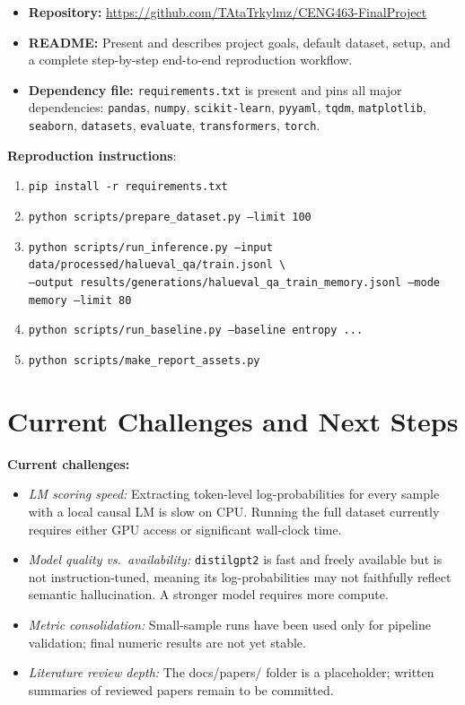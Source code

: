 \documentclass[12pt,a4paper]{article}
\begin{document}
\begin{itemize}
  \item \textbf{Repository:} \url{https://github.com/TAtaTrkylmz/CENG463-FinalProject}
  \item \textbf{README:} Present and describes project goals, default dataset, setup, and a complete step-by-step end-to-end reproduction workflow.
  \item \textbf{Dependency file:} \texttt{requirements.txt} is present and pins all major dependencies:
    \texttt{pandas}, \texttt{numpy}, \texttt{scikit-learn}, \texttt{pyyaml}, \texttt{tqdm}, \texttt{matplotlib}, \texttt{seaborn}, \texttt{datasets}, \texttt{evaluate}, \texttt{transformers}, \texttt{torch}.
\end{itemize}

\textbf{Reproduction instructions}:
\begin{enumerate}
  \item \texttt{pip install -r requirements.txt}
  \item \texttt{python scripts/prepare\_dataset.py --limit 100}
  \item \texttt{python scripts/run\_inference.py --input data/processed/halueval\_qa/train.jsonl \textbackslash}\\\quad\texttt{--output results/generations/halueval\_qa\_train\_memory.jsonl --mode memory --limit 80}
  \item \texttt{python scripts/run\_baseline.py --baseline entropy ...}
  \item \texttt{python scripts/make\_report\_assets.py}
\end{enumerate}

\section{Current Challenges and Next Steps}
\label{sec:challenges}

\textbf{Current challenges:}
\begin{itemize}
  \item \emph{LM scoring speed:} Extracting token-level log-probabilities for every sample with a local causal LM is slow on CPU. Running the full dataset currently requires either GPU access or significant wall-clock time.
  \item \emph{Model quality vs.\ availability:} \texttt{distilgpt2} is fast and freely available but is not instruction-tuned, meaning its log-probabilities may not faithfully reflect semantic hallucination. A stronger model requires more compute.
  \item \emph{Metric consolidation:} Small-sample runs have been used only for pipeline validation; final numeric results are not yet stable.
  \item \emph{Literature review depth:} The docs/papers/ folder is a placeholder; written summaries of reviewed papers remain to be committed.
\end{itemize}
\end{document}
